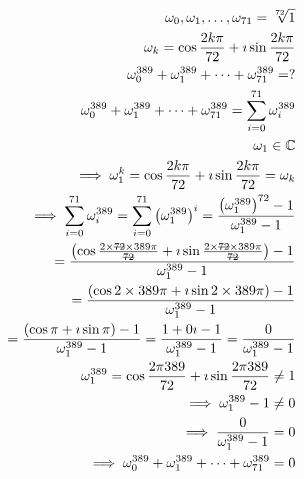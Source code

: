 \documentclass{article}
\newcommand{\stkout}[1]{\ifmmode\text{\sout{\ensuremath{#1}}}\else\sout{#1}\fi}
\begin{document}
    \begin{align*}
        \omega_0, \omega_1, \dots, \omega_{71} = \sqrt[72]{1}\\
        \omega_k = \cos{\frac{2k\pi}{72}} + \imath\sin{\frac{2k\pi}{72}}\\
        \omega_0 ^ {389} + \omega_1 ^ {389} + \dots + \omega_{71} ^ {389} = ?\\
        \omega_0 ^ {389} + \omega_1 ^ {389} + \dots + \omega_{71} ^ {389} = \displaystyle\sum_{i=0}^{71} \omega_i ^ {389}\\
        \omega_1 \in \mathbb{C}\\
        \implies \omega_1 ^ k = \cos{\frac{2k\pi}{72}} + \imath\sin{\frac{2k\pi}{72}} = \omega_k\\
        \implies \displaystyle\sum_{i=0}^{71} \omega_i ^ {389}
        = \displaystyle\sum_{i=0}^{71} \left(\omega_1 ^ {389}\right) ^ i
        = \frac{\left(\omega_1 ^ {389}\right) ^ {72} - 1}{\omega_1 ^ {389} - 1}\\
        = \frac{\left(\cos{\frac{2\times\stkout{72}\times389\pi}{\stkout{72}}} + \imath\sin{\frac{2\times\stkout{72}\times389\pi}{\stkout{72}}}\right) - 1}{\omega_1 ^ {389} - 1}\\
        = \frac{\left(\cos{2\times389\pi} + \imath\sin{2\times389\pi}\right) - 1}{\omega_1 ^ {389} - 1}\\
        = \frac{\left(\cos\pi + \imath\sin\pi\right) - 1}{\omega_1 ^ {389} - 1} = \frac{1 + 0\imath - 1}{\omega_1 ^ {389} - 1} = \frac{0}{\omega_1 ^ {389} - 1}\\
        \omega_1 ^ {389} = \cos{\frac{2\pi389}{72}} + \imath\sin{\frac{2\pi389}{72}} \neq 1\\
        \implies \omega_1 ^ {389} - 1 \neq 0\\
        \implies \frac{0}{\omega_1 ^ {389} - 1} = 0\\
        \implies \omega_0 ^ {389} + \omega_1 ^ {389} + \dots + \omega_{71} ^ {389} = 0
    \end{align*}
\end{document}
